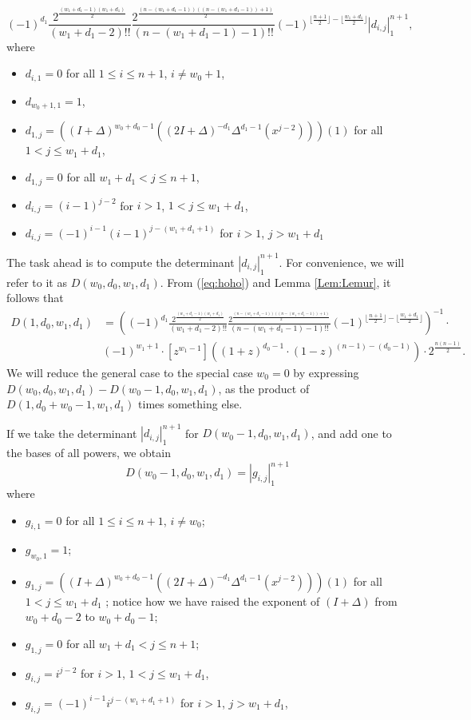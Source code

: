 \documentclass[10pt,reqno]{amsart}
\theoremstyle{plain}
\theoremstyle{definition}
\theoremstyle{remark}
\def\determinant#1{\left|#1\right|}
\begin{document}
\begin{equation}
(-1)^{d_1}
\frac{2^{\frac{(w_1+d_1-1)(w_1+d_1)}{2}}}{(w_1+d_1-2)!!}
\frac{2^{\frac{(n-(w_1+d_1-1))((n-(w_1+d_1-1))+1)}{2}}}{(n-(w_1+d_1-1)-1)!!}
(-1)^{\lfloor \frac{n+1}{2} \rfloor - \lfloor \frac{w_1+d_1}{2} \rfloor}
\determinant{d_{i,j}}_1^{n+1},
\label{eq:hoho}
\end{equation} 
where 
\begin{itemize}
\item
$d_{i,1}=0$ for all $1\leq i\leq n+1$, $i\ne w_0+1$,
\item
$d_{w_0+1,1}=1$,
\item
$d_{1,j} = ((I+\Delta)^{w_0+d_0-1}
((2I+\Delta)^{-d_1}\Delta^{d_1-1}(x^{j-2})))(1)$
           for all $1<j\leq w_1+d_1$,
\item
$d_{1,j} = 0$ for all $w_1+d_1<j\leq n+1$,
\item $d_{i,j} = (i-1)^{j-2}$ for $i>1$, $1<j\leq w_1+d_1$,
\item $d_{i,j} = (-1)^{i-1} (i-1)^{j-(w_1+d_1+1)}$ for $i>1$, $j>w_1+d_1$
\end{itemize}

The task ahead is to compute the determinant $\determinant{d_{i,j}}_1^{n+1}$.
For convenience, we will refer to it as $D(w_0,d_0,w_1,d_1)$.
From (\ref{eq:hoho}) and Lemma \ref{Lem:Lemur}, it follows that
\[
\begin{aligned}
D(1,d_0,w_1,d_1) &= 
((-1)^{d_1}
\frac{2^{\frac{(w_1+d_1-1)(w_1+d_1)}{2}}}{(w_1+d_1-2)!!}
\frac{2^{\frac{(n-(w_1+d_1-1))((n-(w_1+d_1-1))+1)}{2}}}{(n-(w_1+d_1-1)-1)!!}
(-1)^{\lfloor \frac{n+1}{2} \rfloor - \lfloor \frac{w_1+d_1}{2} \rfloor})^{-1}
\cdot \\
&(-1)^{w_1+1}\cdot
[z^{w_1-1}]((1+z)^{d_0-1} \cdot (1-z)^{(n-1)-(d_0-1)})\cdot
2^{\frac{n(n-1)}{2}}.
\end{aligned}
\]
We will reduce the general case to the special
case $w_0=0$ by expressing
$D(w_0,d_0,w_1,d_1)-D(w_0-1,d_0,w_1,d_1)$, as the product of
$D(1,d_0+w_0-1,w_1,d_1)$ times something else.

If we take the determinant $\determinant{d_{i,j}}_1^{n+1}$ for
$D(w_0-1,d_0,w_1,d_1)$, and add one to the bases of all powers, we
obtain
\begin{equation}
D(w_0-1,d_0,w_1,d_1) = \determinant{g_{i,j}}_1^{n+1}
\end{equation}
where
\begin{itemize}
\item $g_{i,1} = 0$ for all $1\leq i \leq n+1$, $i\ne w_0$;
\item $g_{w_0,1} = 1$;
\item $g_{1,j} = ((I+\Delta)^{w_0+d_0-1}
((2I+\Delta)^{-d_1}\Delta^{d_1-1}(x^{j-2})))(1)$ for all
$1<j\leq w_1+d_1$
; notice
how we have raised the exponent of $(I+\Delta)$ from $w_0+d_0-2$
to $w_0+d_0-1$;
\item $g_{1,j} = 0$ for all $w_1+d_1<j\leq n+1$;
\item $g_{i,j} = i^{j-2}$ for $i>1$, $1<j\leq w_1+d_1$,
\item $g_{i,j} = (-1)^{i-1} i^{j-(w_1+d_1+1)}$ for $i>1$, $j>w_1+d_1$,
\end{itemize}
\end{document}
